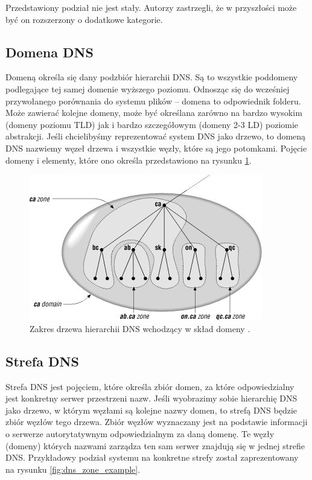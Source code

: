 Przedstawiony podział nie jest stały. Autorzy zastrzegli, że w przyszłości może być on rozszerzony o dodatkowe kategorie.

\subsection{Domena DNS}
Domeną określa się dany podzbiór hierarchii DNS. Są to wszystkie poddomeny podlegające tej samej domenie wyższego poziomu. Odnosząc
się do wcześniej przywołanego porównania do systemu plików -- domena to odpowiednik folderu. Może zawierać kolejne domeny, może być
określana zarówno na bardzo wysokim (domeny poziomu TLD) jak i bardzo szczegółowym (domeny 2-3 LD) poziomie abstrakcji. Jeśli
chcielibyśmy reprezentować system DNS jako drzewo, to domeną DNS nazwiemy węzeł drzewa i wszystkie węzły, które są jego potomkami.
Pojęcie domeny i elementy, które ono określa przedstawiono na rysunku \ref{fig:domain_dns_example}.

\begin{center}
	\begin{figure}
	\includegraphics[scale=0.8]{image/domain_example}
	\caption{Zakres drzewa hierarchii DNS wchodzący w skład domeny \cite{domain_example}.}
	\label{fig:domain_dns_example}
	\end{figure}
\end{center}

\subsection{Strefa DNS}
Strefa DNS jest pojęciem, które określa zbiór domen, za które odpowiedzialny jest konkretny serwer przestrzeni nazw. Jeśli wyobrazimy
sobie hierarchię DNS jako drzewo, w którym węzłami są kolejne nazwy domen, to strefą DNS będzie zbiór węzłów tego drzewa. Zbiór
węzłów wyznaczany jest na podstawie informacji o serwerze autorytatywnym odpowiedzialnym za daną domenę. Te węzły (domeny)
których nazwami zarządza ten sam serwer znajdują się w jednej strefie DNS. Przykładowy podział systemu na konkretne strefy został
zaprezentowany na rysunku \ref{fig:dns_zone_example}.

